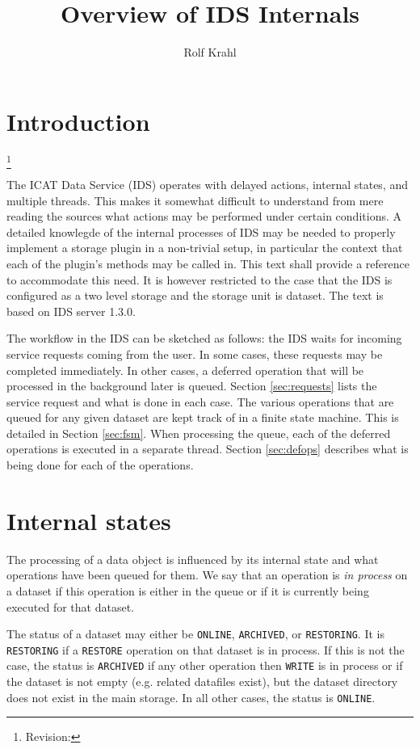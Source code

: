 \documentclass[paper=a4]{scrartcl}
\title{Overview of IDS Internals}
\author{Rolf Krahl}
\newcommand{\revhint}{%
  \begingroup%
  \let\thefootnote\relax%
  \footnote{Revision: }%
  \addtocounter{footnote}{-1}%
  \endgroup%
}
\begin{document}
\maketitle

\section{Introduction}

\revhint{}%
The ICAT Data Service (IDS) operates with delayed actions, internal
states, and multiple threads.  This makes it somewhat difficult to
understand from mere reading the sources what actions may be performed
under certain conditions.  A detailed knowlegde of the internal
processes of IDS may be needed to properly implement a storage plugin
in a non-trivial setup, in particular the context that each of the
plugin's methods may be called in.  This text shall provide a
reference to accommodate this need.  It is however restricted to the
case that the IDS is configured as a two level storage and the storage
unit is dataset.  The text is based on IDS server 1.3.0.

The workflow in the IDS can be sketched as follows: the IDS waits for
incoming service requests coming from the user.  In some cases, these
requests may be completed immediately.  In other cases, a deferred
operation that will be processed in the background later is queued.
Section \ref{sec:requests} lists the service request and what is done
in each case.  The various operations that are queued for any given
dataset are kept track of in a finite state machine.  This is detailed
in Section \ref{sec:fsm}.  When processing the queue, each of the
deferred operations is executed in a separate thread.  Section
\ref{sec:defops} describes what is being done for each of the
operations.


\section{Internal states}
\label{sec:states}

The processing of a data object is influenced by its internal state
and what operations have been queued for them.  We say that an
operation is \emph{in process} on a dataset if this operation is
either in the queue or if it is currently being executed for that
dataset.

The status of a dataset may either be \texttt{ONLINE},
\texttt{ARCHIVED}, or \texttt{RESTORING}.  It is \texttt{RESTORING} if
a \texttt{RESTORE} operation on that dataset is in process.  If this
is not the case, the status is \texttt{ARCHIVED} if any other
operation then \texttt{WRITE} is in process or if the dataset is not
empty (e.g. related datafiles exist), but the dataset directory does
not exist in the main storage.  In all other cases, the status is
\texttt{ONLINE}.
\end{document}

